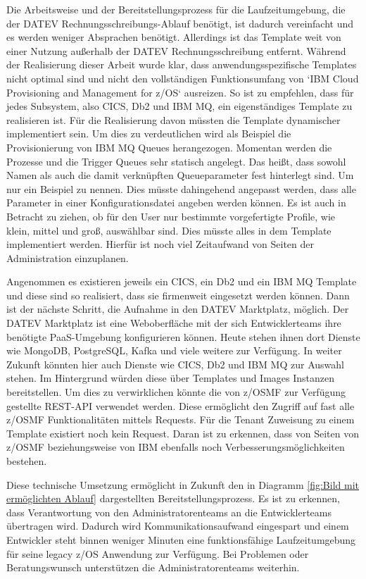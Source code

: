 Die Arbeitsweise und der Bereitstellungsprozess für die Laufzeitumgebung, die der DATEV Rechnungsschreibungs-Ablauf benötigt, ist dadurch vereinfacht und es werden weniger Absprachen benötigt.
Allerdings ist das Template weit von einer Nutzung außerhalb der DATEV Rechnungsschreibung entfernt.
Während der Realisierung dieser Arbeit wurde klar, dass anwendungsspezifische Templates nicht optimal sind und nicht den vollständigen Funktionsumfang von `IBM Cloud Provisioning and Management for z/OS` ausreizen.
So ist zu empfehlen, dass für jedes Subsystem, also CICS, Db2 und IBM MQ, ein eigenständiges Template zu realisieren ist.
Für die Realisierung davon müssten die Template dynamischer implementiert sein.
Um dies zu verdeutlichen wird als Beispiel die Provisionierung von IBM MQ Queues herangezogen.
Momentan werden die Prozesse und die Trigger Queues sehr statisch angelegt.
Das heißt, dass sowohl Namen als auch die damit verknüpften Queueparameter fest hinterlegt sind.
Um nur ein Beispiel zu nennen.
Dies müsste dahingehend angepasst werden, dass alle Parameter in einer Konfigurationsdatei angeben werden können.
Es ist auch in Betracht zu ziehen, ob für den User nur bestimmte vorgefertigte Profile, wie \glqq klein\grqq, \glqq mittel\grqq{} und \glqq groß\grqq, auswählbar sind.
Dies müsste alles in dem Template implementiert werden.
Hierfür ist noch viel Zeitaufwand von Seiten der Administration einzuplanen.

Angenommen es existieren jeweils ein CICS, ein Db2 und ein IBM MQ Template und diese sind so realisiert, dass sie firmenweit eingesetzt werden können.
Dann ist der nächste Schritt, die Aufnahme in den \glqq DATEV Marktplatz\grqq, möglich.
Der \glqq DATEV Marktplatz\grqq{} ist eine Weboberfläche mit der sich Entwicklerteams ihre benötigte PaaS-Umgebung konfigurieren können.
Heute stehen ihnen dort Dienste wie MongoDB, PostgreSQL, Kafka und viele weitere zur Verfügung.
In weiter Zukunft könnten hier auch Dienste wie CICS, Db2 und IBM MQ zur Auswahl stehen.
Im Hintergrund würden diese über Templates und Images Instanzen bereitstellen.
Um dies zu verwirklichen könnte die von z/OSMF zur Verfügung gestellte REST-API verwendet werden.
Diese ermöglicht den Zugriff auf fast alle z/OSMF Funktionalitäten mittels Requests.
Für die \glqq Tenant\grqq{} Zuweisung zu einem Template existiert noch kein Request.
Daran ist zu erkennen, dass von Seiten von z/OSMF beziehungsweise von IBM ebenfalls noch Verbesserungsmöglichkeiten bestehen.

Diese technische Umsetzung ermöglicht in Zukunft den in Diagramm \ref{fig:Bild mit ermöglichten Ablauf} dargestellten Bereitstellungsprozess.
Es ist zu erkennen, dass Verantwortung von den Administratorenteams an die Entwicklerteams übertragen wird.
Dadurch wird Kommunikationsaufwand eingespart und einem Entwickler steht binnen weniger Minuten eine funktionsfähige Laufzeitumgebung für seine legacy z/OS Anwendung zur Verfügung.
Bei Problemen oder Beratungswunsch unterstützen die Administratorenteams weiterhin.

